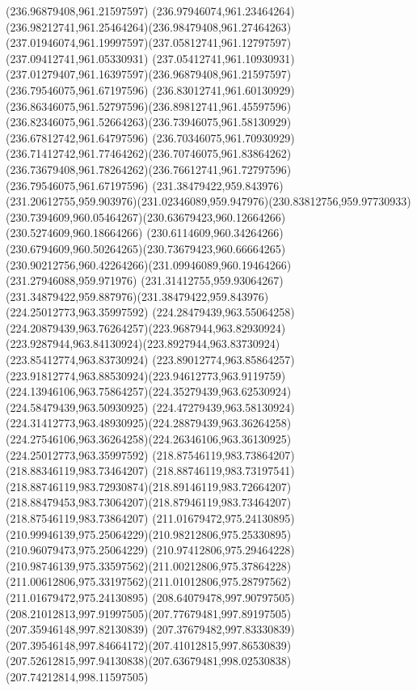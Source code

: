 {{		\moveto(236.96879408,961.21597597)
		\curveto(236.97946074,961.23464264)(236.98212741,961.25464264)(236.98479408,961.27464263)
		\curveto(237.01946074,961.19997597)(237.05812741,961.12797597)(237.09412741,961.05330931)
		\curveto(237.05412741,961.10930931)(237.01279407,961.16397597)(236.96879408,961.21597597)
		\moveto(236.79546075,961.67197596)
		\curveto(236.83012741,961.60130929)(236.86346075,961.52797596)(236.89812741,961.45597596)
		\curveto(236.82346075,961.52664263)(236.73946075,961.58130929)(236.67812742,961.64797596)
		\curveto(236.70346075,961.70930929)(236.71412742,961.77464262)(236.70746075,961.83864262)
		\curveto(236.73679408,961.78264262)(236.76612741,961.72797596)(236.79546075,961.67197596)
		\moveto(231.38479422,959.843976)
		\curveto(231.20612755,959.903976)(231.02346089,959.947976)(230.83812756,959.97730933)
		\curveto(230.7394609,960.05464267)(230.63679423,960.12664266)(230.5274609,960.18664266)
		\curveto(230.6114609,960.34264266)(230.6794609,960.50264265)(230.73679423,960.66664265)
		\curveto(230.90212756,960.42264266)(231.09946089,960.19464266)(231.27946088,959.971976)
		\curveto(231.31412755,959.93064267)(231.34879422,959.887976)(231.38479422,959.843976)
		\moveto(224.25012773,963.35997592)
		\curveto(224.28479439,963.55064258)(224.20879439,963.76264257)(223.9687944,963.82930924)
		\curveto(223.9287944,963.84130924)(223.8927944,963.83730924)(223.85412774,963.83730924)
		\curveto(223.89012774,963.85864257)(223.91812774,963.88530924)(223.94612773,963.9119759)
		\curveto(224.13946106,963.75864257)(224.35279439,963.62530924)(224.58479439,963.50930925)
		\curveto(224.47279439,963.58130924)(224.31412773,963.48930925)(224.28879439,963.36264258)
		\curveto(224.27546106,963.36264258)(224.26346106,963.36130925)(224.25012773,963.35997592)
		\moveto(218.87546119,983.73864207)
		\lineto(218.88346119,983.73464207)
		\curveto(218.88746119,983.73197541)(218.88746119,983.72930874)(218.89146119,983.72664207)
		\curveto(218.88479453,983.73064207)(218.87946119,983.73464207)(218.87546119,983.73864207)
		\moveto(211.01679472,975.24130895)
		\curveto(210.99946139,975.25064229)(210.98212806,975.25330895)(210.96079473,975.25064229)
		\curveto(210.97412806,975.29464228)(210.98746139,975.33597562)(211.00212806,975.37864228)
		\curveto(211.00612806,975.33197562)(211.01012806,975.28797562)(211.01679472,975.24130895)
		\moveto(208.64079478,997.90797505)
		\curveto(208.21012813,997.91997505)(207.77679481,997.89197505)(207.35946148,997.82130839)
		\curveto(207.37679482,997.83330839)(207.39546148,997.84664172)(207.41012815,997.86530839)
		\curveto(207.52612815,997.94130838)(207.63679481,998.02530838)(207.74212814,998.11597505)
}}
